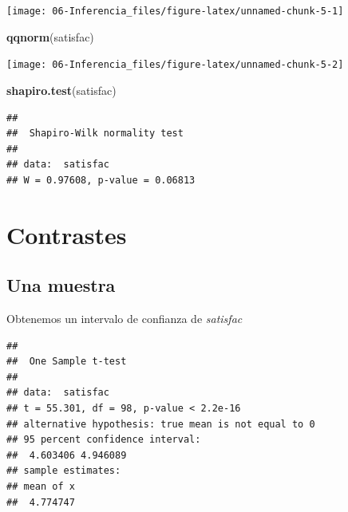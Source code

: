 \documentclass[]{book}
\newenvironment{Shaded}{\begin{snugshade}}{\end{snugshade}}
\newcommand{\KeywordTok}[1]{\textcolor[rgb]{0.13,0.29,0.53}{\textbf{#1}}}
\newcommand{\CommentTok}[1]{\textcolor[rgb]{0.56,0.35,0.01}{\textit{#1}}}
\newcommand{\NormalTok}[1]{#1}
\begin{document}
\begin{center}\texttt{[image: 06-Inferencia\_files/figure-latex/unnamed-chunk-5-1]} \end{center}

\begin{Shaded}
\begin{Highlighting}[]
\KeywordTok{qqnorm}\NormalTok{(satisfac)}
\end{Highlighting}
\end{Shaded}

\begin{center}\texttt{[image: 06-Inferencia\_files/figure-latex/unnamed-chunk-5-2]} \end{center}

\begin{Shaded}
\begin{Highlighting}[]
\KeywordTok{shapiro.test}\NormalTok{(satisfac)}
\end{Highlighting}
\end{Shaded}

\begin{verbatim}
## 
##  Shapiro-Wilk normality test
## 
## data:  satisfac
## W = 0.97608, p-value = 0.06813
\end{verbatim}

\section{Contrastes}\label{contrastes}

\subsection{Una muestra}\label{una-muestra}

Obtenemos un intervalo de confianza de \emph{satisfac}

\begin{Shaded}
\end{Shaded}

\begin{verbatim}
## 
##  One Sample t-test
## 
## data:  satisfac
## t = 55.301, df = 98, p-value < 2.2e-16
## alternative hypothesis: true mean is not equal to 0
## 95 percent confidence interval:
##  4.603406 4.946089
## sample estimates:
## mean of x 
##  4.774747
\end{verbatim}
\end{document}
